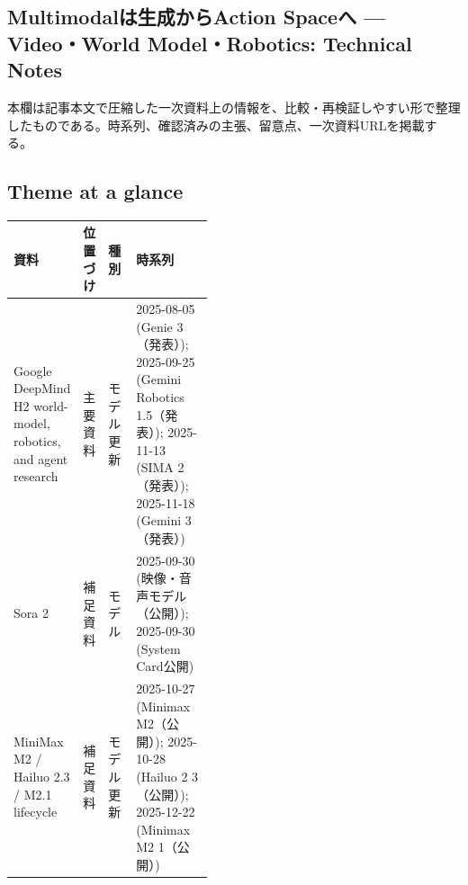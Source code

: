 \subsection*{Multimodalは生成からAction Spaceへ — Video・World Model・Robotics: Technical Notes}
本欄は記事本文で圧縮した一次資料上の情報を、比較・再検証しやすい形で整理したものである。時系列、確認済みの主張、留意点、一次資料URLを掲載する。
\medskip
\subsection*{Theme at a glance}
\begin{center}
\footnotesize
\begin{tabularx}{\linewidth}{@{}p{0.20\linewidth}p{0.10\linewidth}p{0.14\linewidth}X@{}}
\toprule
資料 & 位置づけ & 種別 & 時系列 \\
\midrule
Google DeepMind H2 world-model, robotics, and agent research & 主要資料 & モデル更新 & 2025-08-05 (Genie 3（発表）); 2025-09-25 (Gemini Robotics 1.5（発表）); 2025-11-13 (SIMA 2（発表）); 2025-11-18 (Gemini 3（発表）)    \\
Sora 2 & 補足資料 & モデル & 2025-09-30 (映像・音声モデル（公開）); 2025-09-30 (System Card公開)    \\
MiniMax M2 / Hailuo 2.3 / M2.1 lifecycle & 補足資料 & モデル更新 & 2025-10-27 (Minimax M2（公開）); 2025-10-28 (Hailuo 2 3（公開）); 2025-12-22 (Minimax M2 1（公開）)    \\
\bottomrule
\end{tabularx}
\end{center}
\normalsize

